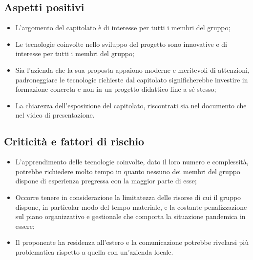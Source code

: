 \subsection{Aspetti positivi}
\begin{itemize}
    \item L’argomento del capitolato è di interesse per tutti i membri del gruppo;
    \item Le tecnologie coinvolte nello sviluppo del progetto sono innovative e di interesse per tutti i membri del gruppo;
    \item Sia l’azienda che la sua proposta appaiono moderne e meritevoli di attenzioni, padroneggiare le tecnologie richieste dal capitolato significherebbe investire in formazione concreta e non in un progetto didattico fine a sé stesso;
    \item La chiarezza dell’esposizione del capitolato, riscontrati sia nel documento che nel video di presentazione.
\end{itemize}
\subsection{Criticità e fattori di rischio}
\begin{itemize}
    \item L’apprendimento delle tecnologie coinvolte, dato il loro numero e complessità, potrebbe richiedere molto tempo in quanto nessuno dei membri del gruppo dispone di esperienza pregressa con la maggior parte di esse;
    \item Occorre tenere in considerazione la limitatezza delle risorse di cui il gruppo dispone, in particolar modo del tempo materiale, e la costante penalizzazione sul piano organizzativo e gestionale che comporta la situazione pandemica in essere;
    \item Il proponente ha residenza all’estero e la comunicazione potrebbe rivelarsi più problematica rispetto a quella con un’azienda locale.
\end{itemize}
